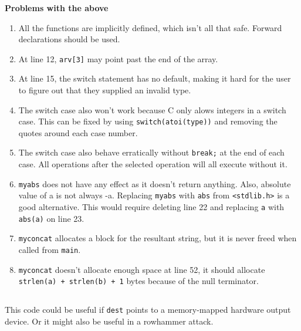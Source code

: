 \documentclass[a4paper,11pt]{article}
\def\code#1{\texttt{#1}}
\begin{document}
\textbf{Problems with the above}
\begin{enumerate}
  \item
    All the functions are implicitly defined, which isn't all that safe.
    Forward declarations should be used.
  \item
    At line 12, \code{arv[3]} may point past the end of the array.
  \item
    At line 15, the switch statement has no default, making it hard for the user to figure
    out that they supplied an invalid type.
  \item
    The switch case also won't work because C only alows integers in a switch case.
    This can be fixed by using \code{switch(atoi(type))} and removing the quotes around
    each case number.
  \item
    The switch case also behave erratically without \code{break;} at the end of each case.
    All operations after the selected operation will all execute without it.
  \item
    \code{myabs} does not have any effect as it doesn't return anything.
    Also, absolute value of a is not always -a.
    Replacing \code{myabs} with \code{abs} from \code{<stdlib.h>} is a good alternative.
    This would require deleting line 22 and replacing \code{a} with \code{abs(a)} on line 23.
  \item
    \code{myconcat} allocates a block for the resultant string, but it is never freed
    when called from \code{main}.
  \item
    \code{myconcat} doesn't allocate enough space at line 52, it should allocate
    \code{strlen(a) + strlen(b) + 1} bytes because of the null terminator.
\end{enumerate}

\subsection{}
This code could be useful if \code{dest} points to a memory-mapped hardware output device.
Or it might also be useful in a rowhammer attack.
\end{document}

